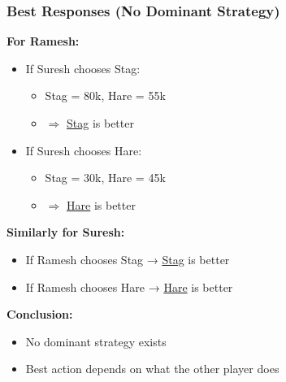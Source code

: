 \begin{frame}[fragile]\frametitle{Best Responses (No Dominant Strategy)}

\textbf{For Ramesh:}

\begin{itemize}
  \item If Suresh chooses Stag:
  \begin{itemize}
    \item Stag = 80k, Hare = 55k
    \item $\Rightarrow$ \underline{Stag} is better
  \end{itemize}
  
  \item If Suresh chooses Hare:
  \begin{itemize}
    \item Stag = 30k, Hare = 45k
    \item $\Rightarrow$ \underline{Hare} is better
  \end{itemize}
\end{itemize}

\vspace{6pt}

\textbf{Similarly for Suresh:}

\begin{itemize}
  \item If Ramesh chooses Stag → \underline{Stag} is better
  \item If Ramesh chooses Hare → \underline{Hare} is better
\end{itemize}

\vspace{8pt}

\textbf{Conclusion:}
\begin{itemize}
  \item No dominant strategy exists
  \item Best action depends on what the other player does
\end{itemize}

\end{frame}

